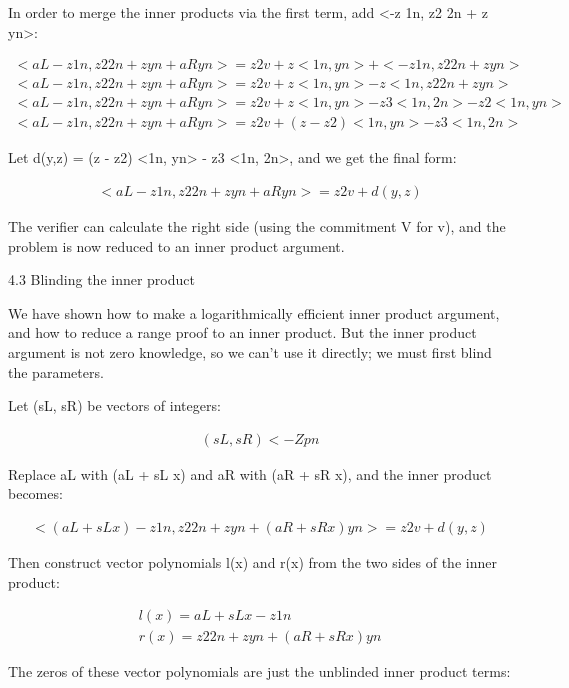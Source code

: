 \documentclass{article}
\begin{document}
In order to merge the inner products via the first term, add <-z 1n, z2 2n + z yn>:

\begin{eqnarray}
  <aL - z 1n, z2 2n + z yn + aRyn> = z2 v + z <1n, yn> + <-z 1n, z2 2n + z yn>\\
  <aL - z 1n, z2 2n + z yn + aRyn> = z2 v + z <1n, yn> - z <1n, z2 2n + z yn>\\
  <aL - z 1n, z2 2n + z yn + aRyn> = z2 v + z <1n, yn> - z3 <1n, 2n> - z2 <1n, yn>\\
  <aL - z 1n, z2 2n + z yn + aRyn> = z2 v + (z - z2) <1n, yn> - z3 <1n, 2n>
\end{eqnarray}
  
Let d(y,z) = (z - z2) <1n, yn> - z3 <1n, 2n>, and we get the final form:

\begin{eqnarray}
  <aL - z 1n, z2 2n + z yn + aRyn> = z2 v + d(y,z)
\end{eqnarray}

The verifier can calculate the right side (using the commitment V for v), and the problem is now reduced to an inner product argument.


4.3 Blinding the inner product

We have shown how to make a logarithmically efficient inner product argument, and how to reduce a range proof to an inner product.  But the inner product argument is not zero knowledge, so we can’t use it directly; we must first blind the parameters.

Let (sL, sR) be vectors of integers:

\begin{eqnarray}
  (sL, sR) <- Zpn
\end{eqnarray}

Replace aL with (aL + sL x) and aR with (aR + sR x), and the inner product becomes:

\begin{eqnarray}
  <(aL + sL x) - z 1n, z2 2n + z yn + (aR+ sR x)yn> = z2 v + d(y,z)
\end{eqnarray}

Then construct vector polynomials l(x) and r(x) from the two sides of the inner product:

\begin{eqnarray}
  l(x) = aL + sL x - z 1n\\
  r(x) = z2 2n + z yn + (aR+ sR x)yn
\end{eqnarray}

The zeros of these vector polynomials are just the unblinded inner product terms:
\end{document}
